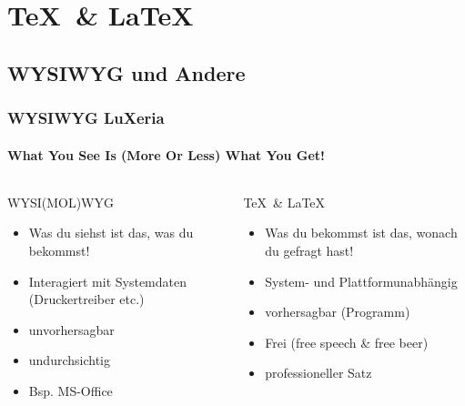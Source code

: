 \section{\TeX~\& \LaTeX}
\begin{frame}
    \frametitle{}
    \tableofcontents[currentsection]
\end{frame}

\subsection{WYSIWYG und Andere}
\begin{frame}
	\frametitle{WYSIWYG \hfill{} LuXeria}
    \framesubtitle{What You See Is (More Or Less) What You Get!}
    \begin{columns}
        \begin{column}{5cm}
            \begin{alertblock}{WYSI(MOL)WYG}
                \begin{itemize}
                    \item Was du siehst ist das, was du bekommst!
                    \item Interagiert mit Systemdaten (Druckertreiber etc.)
                    \item unvorhersagbar
                    \item undurchsichtig
                    \item Bsp. MS-Office
                \end{itemize}
            \end{alertblock}
        \end{column}
        \begin{column}{5cm}
            \begin{exampleblock}{\TeX~\& \LaTeX}
                \begin{itemize}
                    \item Was du bekommst ist das, wonach du gefragt hast!
                    \item System- und Plattformunabhängig
                    \item vorhersagbar (Programm)
                    \item Frei (free speech \& free beer)
                    \item professioneller Satz
                \end{itemize}
            \end{exampleblock}
        \end{column}
    \end{columns}
\end{frame}

